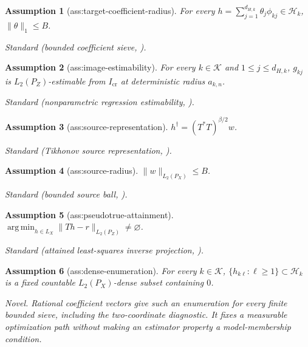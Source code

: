 \documentclass{article}
\newtheorem{assumption}{Assumption}
\begin{document}
\begin{assumption}[ass:target-coefficient-radius]\label{ass:target-coefficient-radius}
For every \(h=\sum_{j=1}^{d_{H,k}}\theta_j\phi_{kj}\in\mathcal H_k\), \(\|\theta\|_1\le B\).
\par\smallskip\noindent\emph{Standard} (bounded coefficient sieve, \cite{LiLanSyrgkanisWangUehara2024RegularizedDeepIV}).
\end{assumption}

\begin{assumption}[ass:image-estimability]\label{ass:image-estimability}
For every \(k\in\mathcal K\) and \(1\le j\le d_{H,k}\), \(g_{kj}\) is \(L_2(P_Z)\)-estimable from \(I_{\mathrm{cr}}\) at deterministic radius \(a_{k,n}\).
\par\smallskip\noindent\emph{Standard} (nonparametric regression estimability, \cite{LiLanSyrgkanisWangUehara2024RegularizedDeepIV}).
\end{assumption}

\begin{assumption}[ass:source-representation]\label{ass:source-representation}
\(h^\dagger=(T^*T)^{\beta/2}w\).
\par\smallskip\noindent\emph{Standard} (Tikhonov source representation, \cite{TanSyrgkanis2026Adaptive}).
\end{assumption}

\begin{assumption}[ass:source-radius]\label{ass:source-radius}
\(\|w\|_{L_2(P_X)}\le B\).
\par\smallskip\noindent\emph{Standard} (bounded source ball, \cite{TanSyrgkanis2026Adaptive}).
\end{assumption}

\begin{assumption}[ass:pseudotrue-attainment]\label{ass:pseudotrue-attainment}
\(\operatorname*{arg\,min}_{h\in L_X}\|Th-r\|_{L_2(P_Z)}\ne\varnothing\).
\par\smallskip\noindent\emph{Standard} (attained least-squares inverse projection, \cite{AiChen2007MisspecifiedConditionalMoments}).
\end{assumption}

\begin{assumption}[ass:dense-enumeration]\label{ass:dense-enumeration}
For every \(k\in\mathcal K\), \(\{h_{k\ell}:\ell\ge1\}\subset\mathcal H_k\) is a fixed countable \(L_2(P_X)\)-dense subset containing \(0\).
\par\smallskip\noindent\emph{Novel.} Rational coefficient vectors give such an enumeration for every finite bounded sieve, including the two-coordinate diagnostic. It fixes a measurable optimization path without making an estimator property a model-membership condition.
\end{assumption}
\end{document}
